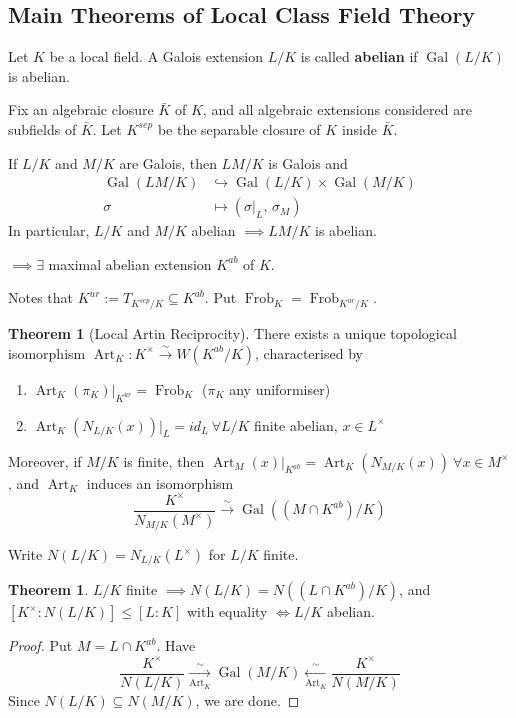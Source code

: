 \documentclass[a4paper]{article}
\theoremstyle{definition}
\theoremstyle{default}
\newtheorem{theorem}[definition]{Theorem}
\theoremstyle{remark}
\DeclareMathOperator{\Gal}{Gal}
\DeclareMathOperator{\Frob}{Frob}
\DeclareMathOperator{\Art}{Art}
\begin{document}
\subsection{Main Theorems of Local Class Field Theory}
Let $K$ be a local field.
A Galois extension $L/K$ is called \textbf{abelian} if $\Gal(L/K)$ is abelian.

Fix an algebraic closure $\bar{K}$ of $K$,
and all algebraic extensions considered are subfields of $\bar{K}$.
Let $K^{sep}$ be the separable closure of $K$ inside $\bar{K}$.

If $L/K$ and $M/K$ are Galois,
then $LM/K$ is Galois and
\begin{align*}
	\Gal(LM/K) &\hookrightarrow \Gal(L/K) \times \Gal(M/K) \\
	\sigma &\mapsto (\sigma|_L,\, \sigma_M)
\end{align*}
In particular, $L/K$ and $M/K$ abelian $\implies LM/K$ is abelian.

$\implies \exists$ maximal abelian extension $K^{ab}$ of $K$.

Notes that $K^{ur} := T_{K^{sep}/K} \subseteq K^{ab}$. Put $\Frob_K = \Frob_{K^{ur}/K}$.

\begin{theorem}[Local Artin Reciprocity]
	There exists a unique topological isomorphism $\Art_K : K^\times \overset{\sim}{\longrightarrow} W(K^{ab}/K)$, characterised by
	\begin{enumerate}
		\item $\Art_K(\pi_K)|_{K^{ur}} = \Frob_K$ ($\pi_K$ any uniformiser)
		\item $\Art_K(N_{L/K}(x))|_L = id_L\ \forall L/K$ finite abelian, $x \in L^\times$
	\end{enumerate}
	Moreover, if $M/K$ is finite, then $\Art_M(x)|_{K^{ab}} = \Art_K(N_{M/K}(x))\ \forall x \in M^\times$,
	and $\Art_K$ induces an isomorphism
	$$\frac{K^\times}{N_{M/K}(M^\times)} \overset{\sim}{\longrightarrow} \Gal((M \cap K^{ab})/K)$$
	\label{103}
\end{theorem}

Write $N(L/K) = N_{L/K}(L^\times)$ for $L/K$ finite.

\begin{theorem}
	$L/K$ finite $\implies N(L/K) = N((L \cap K^{ab})/K)$,
	and $[K^\times:N(L/K)] \leq [L:K]$
	with equality $\iff L/K$ abelian.
	\label{104}
\end{theorem}

\begin{proof}
	Put $M=L \cap K^{ab}$. Have
	$$\frac{K^\times}{N(L/K)} \underset{\Art_K}{\overset{\sim}{\longrightarrow}} \Gal(M/K) \underset{\Art_K}{\overset{\sim}{\longleftarrow}} \frac{K^\times}{N(M/K)}$$
	Since $N(L/K) \subseteq N(M/K)$, we are done.
\end{proof}
\end{document}
